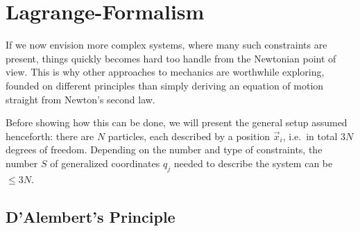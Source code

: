\documentclass[../class_mech_main.tex]{subfiles}
\begin{document}
	\section{Lagrange-Formalism}
If we now envision more complex systems, where many such constraints are present, things quickly becomes hard too handle from the Newtonian point of view. This is why other approaches to mechanics are worthwhile exploring, founded on different principles than simply deriving an equation of motion straight from Newton's second law.


% 


Before showing how this can be done, we will present the general setup assumed henceforth: there are $N$ particles, each described by a position $\vec{x}_i$, i.e.~in total $3 N$ degrees of freedom. Depending on the number and type of constraints, the number $S$ of generalized coordinates $q_j$ needed to describe the system can be $\leq 3N$.



		\subsection{D'Alembert's Principle}
\end{document}
